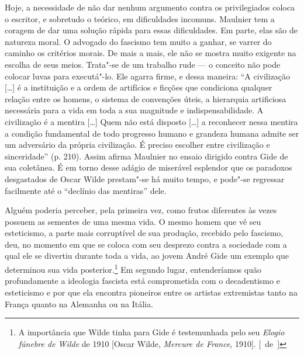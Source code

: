 Hoje, a necessidade de não dar nenhum argumento contra os
privilegiados coloca o escritor, e sobretudo o teórico, em dificuldades
incomuns. Maulnier tem a coragem de dar uma solução rápida para essas
dificuldades. Em parte, elas são de natureza moral. O advogado do
fascismo tem muito a ganhar, se varrer do caminho os critérios morais.
De mais a mais, ele não se mostra muito exigente na escolha de seus
meios. Trata"-se de um trabalho rude --- o conceito não pode colocar luvas
para executá"-lo. Ele agarra firme, e dessa maneira: ``A civilização
{[}\ldots{}{]} é a instituição e a ordem de artifícios e ficções que
condiciona qualquer relação entre os homens, o sistema de convenções
úteis, a hierarquia artificiosa necessária para a vida em toda a sua
magnitude e indispensabilidade. A civilização é a mentira {[}\ldots{}{]} Quem
não está disposto {[}\ldots{}{]} a reconhecer nessa mentira a condição
fundamental de todo progresso humano e grandeza humana admite ser um
adversário da própria civilização. É preciso escolher entre civilização
e sinceridade'' (p. 210). Assim afirma Maulnier no ensaio dirigido
contra Gide de sua coletânea. É em torno desse adágio de miserável
esplendor que os paradoxos desgastados de Oscar Wilde prestam"-se há
muito tempo, e pode"-se regressar facilmente até o ``declínio das
mentiras'' dele.

Alguém poderia perceber, pela primeira vez, como frutos diferentes às
vezes possuem as sementes de uma mesma vida. O mesmo homem que vê seu
esteticismo, a parte mais corruptível de sua produção, recebido pelo
fascismo, deu, no momento em que se coloca com seu desprezo contra a
sociedade com a qual ele se divertiu durante toda a vida, ao jovem
André Gide um exemplo que determinou sua vida posterior.\footnote{A
  importância que Wilde tinha para Gide é testemunhada pelo seu
  \emph{Elogio fúnebre de Wilde} de 1910 {[}Oscar Wilde, \emph{Mercure
  de France}, 1910{]}. [~de~]} Em segundo lugar, entenderíamos quão
profundamente a ideologia fascista está comprometida com o decadentismo
e esteticismo e por que ela encontra pioneiros entre os artistas
extremistas tanto na França quanto na Alemanha ou na Itália.


